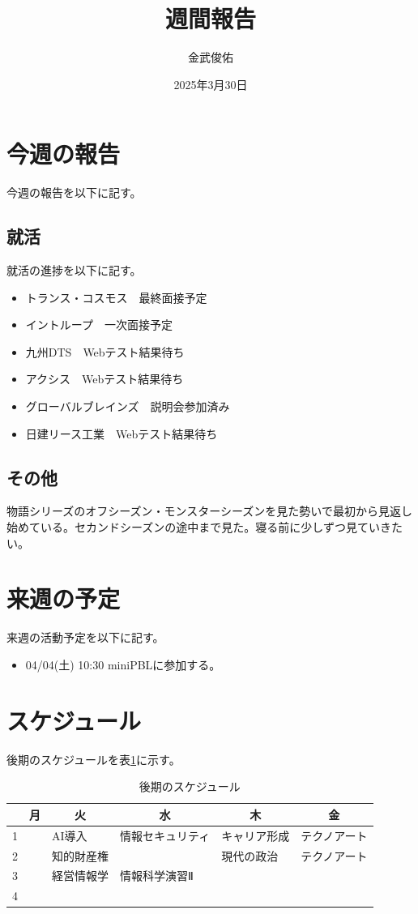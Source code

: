 \documentclass[a4paper,12pt]{ujarticle}
\title{週間報告}
\author{金武俊佑}
\date{2025年3月30日}
\newcommand{\thc}[1]{\multicolumn{1}{c|}{#1}}
\begin{document}
\maketitle

\section{今週の報告}\label{sec:thisweek}
今週の報告を以下に記す。
\subsection{就活}\label{sec:job}
就活の進捗を以下に記す。
\begin{itemize}
  \item トランス・コスモス　最終面接予定
  \item イントループ　一次面接予定
  \item 九州DTS　Webテスト結果待ち
  \item アクシス　Webテスト結果待ち
  \item グローバルブレインズ　説明会参加済み
  \item 日建リース工業　Webテスト結果待ち
\end{itemize}
\subsection{その他}\label{sec:other}
物語シリーズのオフシーズン・モンスターシーズンを見た勢いで最初から見返し始めている。セカンドシーズンの途中まで見た。寝る前に少しずつ見ていきたい。
\section{来週の予定}\label{sec:nextweek}
来週の活動予定を以下に記す。
\begin{itemize}
  \item 04/04(土) 10:30 miniPBLに参加する。
\end{itemize}


\section{スケジュール}\label{sec:schedule}
後期のスケジュールを表\ref{tab:studyschedule}に示す。

\begin{table}[H]
  \caption{後期のスケジュール}\label{tab:studyschedule}
  \centering
  \begin{tabular}{|p{4mm}||p{30mm}|p{30mm}|p{30mm}|p{30mm}|p{30mm}|}\hline
        & \thc{月} & \thc{火} & \thc{水} & \thc{木} & \thc{金} \\ \hline\hline
     1  &     & AI導入    &情報セキュリティ     & キャリア形成 & テクノアート  \\ \hline
     2  &     & 知的財産権 &  & 現代の政治 & テクノアート \\ \hline
     3  &     & 経営情報学 & 情報科学演習Ⅱ &  &  \\ \hline
     4  &  &  & &  & \\ \hline
  \end{tabular}
\end{table}
\end{document}
